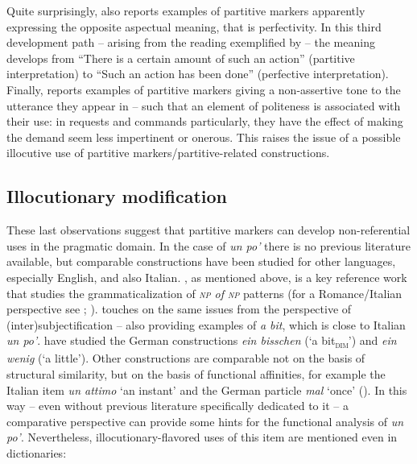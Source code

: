 Quite surprisingly, \citet[545–547]{Budd2014} also reports examples of partitive markers apparently expressing the opposite aspectual meaning, that is perfectivity. In this third development path – arising from the reading exemplified by  – the meaning develops from “There is a certain amount of such an action” (partitive interpretation) to “Such an action has been done” (perfective interpretation). Finally, \citet[547–548]{Budd2014} reports examples of partitive markers giving a non-assertive tone to the utterance they appear in – such that an element of politeness is associated with their use: in requests and commands particularly, they have the effect of making the demand seem less impertinent or onerous. This raises the issue of a possible illocutive use of partitive markers/partitive-related constructions.

\subsection{Illocutionary modification}
\hypertarget{Toc124860660}{}
These last observations suggest that partitive markers can develop non-referen\-tial uses in the pragmatic domain. In the case of \textit{un po’} there is no previous literature available, but comparable constructions have been studied for other languages, especially English, and also Italian. \citet{Traugott2008}, as mentioned above, is a key reference work that studies the grammaticalization of \textit{\textsc{np} of \textsc{np}} patterns (for a Romance/Italian perspective see \citealt{Masini2016}; \citealt{Mihatsch2016}). \citet{Traugott2010} touches on the same issues from the perspective of (inter)subjectification – also providing examples of \textit{a bit}, which is close to Italian \textit{un po’}. \citet{NeelsHartmann2018} have studied the German constructions \textit{ein bisschen} (‘a bit\textsubscript{\textsc{dim}}’) and \textit{ein wenig} (‘a little’). Other constructions are comparable not on the basis of structural similarity, but on the basis of functional affinities, for example the Italian item \textit{un attimo} ‘an instant’ \citep{Voghera2017} and the German particle \textit{mal} ‘once’ (\citealt{KönigLi2018}). In this way – even without previous literature specifically dedicated to it – a comparative perspective can provide some hints for the functional analysis of \textit{un po’}. Nevertheless, illocutionary-flavored uses of this item are mentioned even in dictionaries:

